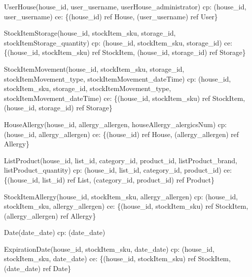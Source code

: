 {\begin{description}
		\item UserHouse(house\_id, user\_username, userHouse\_administrator) \newline
		\acrshort{cp}: (house\_id, user\_username) \newline
		\acrshort{ce}: \{(house\_id) ref House, (user\_username) ref User\}
		
		\item StockItemStorage(house\_id, stockItem\_sku, storage\_id, stockItemStorage\_quantity) \newline
		\acrshort{cp}: (house\_id, stockItem\_sku, storage\_id) \newline
		\acrshort{ce}: \{(house\_id, stockItem\_sku) ref StockItem, (house\_id, storage\_id) ref Storage\}
		
		\item StockItemMovement(house\_id, stockItem\_sku, storage\_id, stockItemMovement\_type, \newline stockItemMovement\_dateTime) \newline
		\acrshort{cp}: (house\_id, stockItem\_sku, storage\_id, stockItemMovement\_type, \newline stockItemMovement\_dateTime) \newline
		\acrshort{ce}: \{(house\_id, stockItem\_sku) ref StockItem, (house\_id, storage\_id) ref Storage\}
		
		\item HouseAllergy(house\_id, allergy\_allergen, houseAllergy\_alergicsNum) \newline
		\acrshort{cp}: (house\_id, allergy\_allergen) \newline
		\acrshort{ce}: \{(house\_id) ref House, (allergy\_allergen) ref Allergy\}
	
		\item ListProduct(house\_id, list\_id, category\_id, product\_id, listProduct\_brand, listProduct\_quantity) \newline
		\acrshort{cp}: (house\_id, list\_id, category\_id, product\_id) \newline
		\acrshort{ce}: \{(house\_id, list\_id) ref List, (category\_id, product\_id) ref Product\}
	
		\item StockItemAllergy(house\_id, stockItem\_sku, allergy\_allergen) \newline
		\acrshort{cp}: (house\_id, stockItem\_sku, allergy\_allergen) \newline
		\acrshort{ce}: \{(house\_id, stockItem\_sku) ref StockItem, (allergy\_allergen) ref Allergy\}
	
		\item Date(date\_date) \newline
		\acrshort{cp}: (date\_date)
	
		\item ExpirationDate(house\_id, stockItem\_sku, date\_date) \newline
		\acrshort{cp}: (house\_id, stockItem\_sku, date\_date) \newline
		\acrshort{ce}: \{(house\_id, stockItem\_sku) ref StockItem, (date\_date) ref Date\}

	\end{description}	
}

